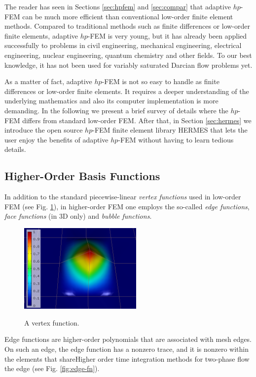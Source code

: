 \documentclass[final,3p,times,twocolumn]{elsarticle}
\begin{document}
The reader has seen in Sections \ref{sec:hpfem} and \ref{sec:compar}
that adaptive $hp$-FEM can be much more efficient than 
conventional low-order finite element methods. Compared to 
traditional methods such as finite differences or low-order finite 
elements, adaptive $hp$-FEM is very young, but 
it has already been applied successfully to problems in civil
engineering, mechanical engineering, electrical engineering, 
nuclear engineering, quantum chemistry and other fields. To our best 
knowledge, it has not been used for variably saturated Darcian 
flow problems yet.

As a matter of fact, adaptive $hp$-FEM is not so easy to handle 
as finite differences or low-order finite elements. It requires 
a deeper understanding of the underlying mathematics and also its 
computer implementation is more demanding. In the following 
we present a brief survey of details where the $hp$-FEM
differs from standard low-order FEM. After that, in Section 
\ref{sec:hermes} we introduce the open source $hp$-FEM finite 
element library HERMES that lets the user enjoy the benefits 
of adaptive $hp$-FEM without having to learn tedious details.

\subsection{Higher-Order Basis Functions}

In addition to the standard piecewise-linear
{\em vertex functions} used in low-order
FEM (see Fig. \ref{fig:vertex-fn}), 
in higher-order FEM one employs 
the so-called {\em edge functions}, 
{\em face functions} (in 3D only) and 
{\em bubble functions}.

\begin{figure}[!htb]
\begin{center}
 {
\includegraphics[width=6cm]{fn_vertex.png}
}
\end{center}
\caption{A vertex function.}
\label{fig:vertex-fn}
\end{figure}

Edge functions are higher-order polynomials
that are associated with mesh edges. On such 
an edge, the edge function has a nonzero trace,
and it is nonzero within the elements that shareHigher order time integration methods for two-phase flow
the edge (see Fig. \ref{fig:edge-fn}).
\end{document}
